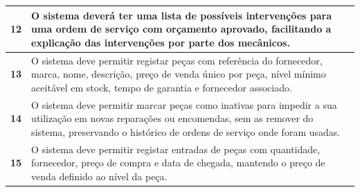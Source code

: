 \documentclass[11pt,a4paper]{article}
\begin{document}
\begin{tabularx}{\textwidth}{@{}|l|X|@{}}
		\textbf{12}  & O sistema deverá ter uma lista de possíveis intervenções para uma ordem de serviço com orçamento aprovado, facilitando a explicação das intervenções por parte dos mecânicos. \\ \hline
		\textbf{13}  & O sistema deve permitir registar peças com referência do fornecedor, marca, nome, descrição, preço de venda único por peça, nível mínimo aceitável em stock, tempo de garantia e fornecedor associado. \\ \hline
		\textbf{14}  & O sistema deve permitir marcar peças como inativas para impedir a sua utilização em novas reparações ou encomendas, sem as remover do sistema, preservando o histórico de ordens de serviço onde foram usadas. \\ \hline
		\textbf{15}  & O sistema deve permitir registar entradas de peças com quantidade, fornecedor, preço de compra e data de chegada, mantendo o preço de venda definido ao nível da peça. \\ \hline
		
	\end{tabularx}
\end{document}
